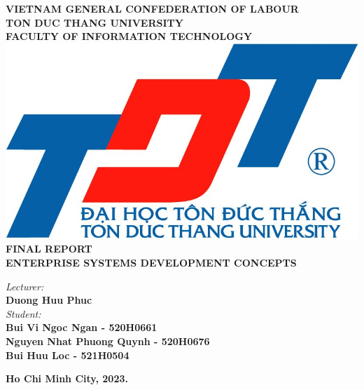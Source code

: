 \documentclass[12pt,a4paper,2sides]{report}
\newcommand{\khoa}{Information Technology} %
\newcommand{\de}{FINAL REPORT}
\newcommand{\monhoc}{Enterprise Systems Development Concepts} %
\newcommand{\gvhd}{Duong Huu Phuc} %
\newcommand{\tacgia}{Bui Vi Ngoc Ngan - 520H0661} %
\newcommand{\svhai}{Nguyen Nhat Phuong Quynh - 520H0676}
\newcommand{\svba}{Bui Huu Loc - 521H0504}
\newcommand{\nam}{2023}
\begin{document}
	
% 
\begin{center}
	\large{\textbf{VIETNAM GENERAL CONFEDERATION OF LABOUR}} \\
	\large{\textbf{TON DUC THANG UNIVERSITY}} \\
	\large{\textbf{\MakeUppercase{FACULTY OF \khoa}}} \\\vspace*{1cm}	
	\includegraphics[width=0.5\linewidth]{lib/TDTlogo.jpg}\\\vspace*{1cm}	
	\LARGE{\textbf{\MakeUppercase{\de}}}\\
\Large{\textbf{\MakeUppercase{\monhoc}}}\vspace*{1.5cm}
\begin{flushright}			
    \large{\textit{Lecturer:}} \\
	\large{\textbf{\gvhd}} 	\\
    \large{\textit{Student:}} \\
	\large{\textbf{\tacgia}}\\
	\large{\textbf{\svhai}}\\
	\large{\textbf{\svba}}\\
	
	\vspace*{1.5cm}
\end{flushright}
	\large{\textbf{Ho Chi Minh City, \nam.}}
\end{center}	
\newpage
 
% 

\newpage
\clearpage
\dominitoc
\tableofcontents %
\listoftables
\listoffigures
\newpage
\clearpage

\clearpage
{}
\setcounter{page}{1}
\clearpage
%
\end{document}
